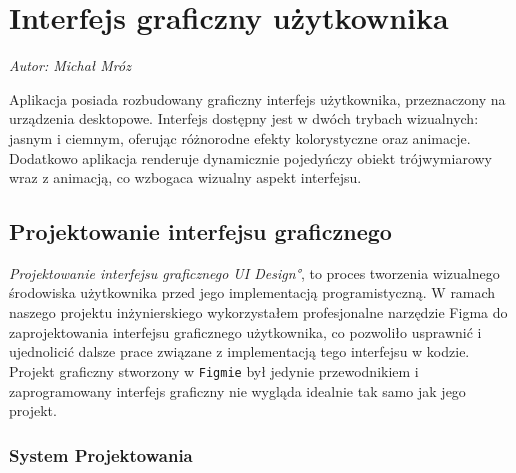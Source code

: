 \chapter{Interfejs graficzny użytkownika}
\label{chap:InterfejsGraficznyUżytkownika}
\textit{Autor: Michał Mróz}
\par Aplikacja posiada rozbudowany graficzny interfejs użytkownika, przeznaczony na urządzenia desktopowe. Interfejs dostępny jest w dwóch trybach wizualnych: jasnym i ciemnym, oferując różnorodne efekty kolorystyczne oraz animacje. Dodatkowo aplikacja renderuje dynamicznie pojedyńczy obiekt trójwymiarowy wraz z animacją, co wzbogaca wizualny aspekt interfejsu.

\section{Projektowanie interfejsu graficznego}
\label{sec:ProjektowanieInterfejsuGraficznego}

\emph{Projektowanie interfejsu graficznego \ang{UI Design}}, to proces tworzenia wizualnego środowiska użytkownika przed jego implementacją programistyczną. W ramach naszego projektu inżynierskiego wykorzystałem profesjonalne narzędzie Figma \cite{Figma} do zaprojektowania interfejsu graficznego użytkownika, co pozwoliło usprawnić i ujednolicić dalsze prace związane z implementacją tego interfejsu w kodzie. Projekt graficzny stworzony w \texttt{Figmie} był jedynie przewodnikiem i zaprogramowany interfejs graficzny nie wygląda idealnie tak samo jak jego projekt. 


\subsection{System Projektowania}
\label{sec:SystemProjektowania}

